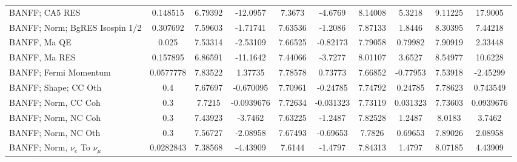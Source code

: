 \documentclass{standalone}
\begin{document}
\begin{tabular}{| l | S | S  S | S  S | S  S | S  S | }
                                                                  BANFF; CA5 RES &        0.148515 &         6.79392 &        -12.0957 &          7.3673 &         -4.6769 &         8.14008 &          5.3218 &         9.11225 &         17.9005 \\ 
                                                  BANFF; Norm; BgRES Isospin 1/2 &        0.307692 &         7.59603 &        -1.71741 &         7.63536 &         -1.2086 &         7.87133 &          1.8446 &         8.30395 &         7.44218 \\ 
                                                                    BANFF, Ma QE &           0.025 &         7.53314 &        -2.53109 &         7.66525 &        -0.82173 &         7.79058 &         0.79982 &         7.90919 &         2.33448 \\ 
                                                                   BANFF, Ma RES &        0.157895 &         6.86591 &        -11.1642 &         7.44066 &         -3.7277 &         8.01107 &          3.6527 &         8.54977 &         10.6228 \\ 
                                                           BANFF; Fermi Momentum &       0.0577778 &         7.83522 &         1.37735 &         7.78578 &         0.73773 &         7.66852 &        -0.77953 &         7.53918 &        -2.45299 \\ 
                                                            BANFF; Shape; CC Oth &             0.4 &         7.67697 &       -0.670095 &         7.70961 &        -0.24785 &         7.74792 &         0.24785 &         7.78623 &        0.743549 \\ 
                                                             BANFF; Norm, CC Coh &             0.3 &          7.7215 &      -0.0939676 &         7.72634 &       -0.031323 &         7.73119 &        0.031323 &         7.73603 &       0.0939676 \\ 
                                                             BANFF; Norm, NC Coh &             0.3 &         7.43923 &         -3.7462 &         7.63225 &         -1.2487 &         7.82528 &          1.2487 &          8.0183 &          3.7462 \\ 
                                                             BANFF; Norm, NC Oth &             0.3 &         7.56727 &        -2.08958 &         7.67493 &        -0.69653 &          7.7826 &         0.69653 &         7.89026 &         2.08958 \\ 
                                           BANFF; Norm, $\nu_{e}$ To $\nu_{\mu}$ &       0.0282843 &         7.38568 &        -4.43909 &          7.6144 &         -1.4797 &         7.84313 &          1.4797 &         8.07185 &         4.43909 \\ 

\end{tabular}
\end{document}
